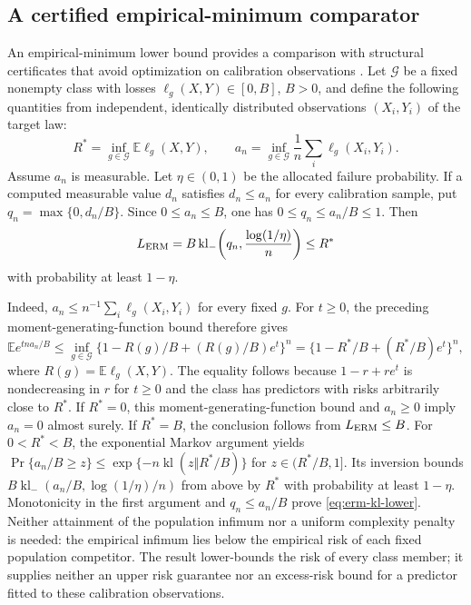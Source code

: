 \subsection{A certified empirical-minimum comparator}
\label{app:erm-comparator}

An empirical-minimum lower bound provides a comparison with structural
certificates that avoid optimization on calibration observations
\citep[Section~2.5]{kumar2026limits}. Let $\mathcal G$ be a fixed nonempty
class with losses $\ell_g(X,Y)\in[0,B]$, $B>0$, and define
the following quantities from independent, identically distributed
observations $(X_i,Y_i)$ of the target law:
\[
 R^*=\inf_{g\in\mathcal G}\mathbb E\ell_g(X,Y),\qquad
 a_n=\inf_{g\in\mathcal G}\frac1n\sum_i\ell_g(X_i,Y_i).
\]
Assume $a_n$ is measurable. Let $\eta\in(0,1)$ be the allocated failure
probability. If a computed measurable value $d_n$ satisfies $d_n\leq a_n$
for every calibration sample, put $q_n=\max\{0,d_n/B\}$.
Since $0\leq a_n\leq B$, one has $0\leq q_n\leq a_n/B\leq1$. Then
\begin{equation}
 L_{\rm ERM}
 =B\operatorname{kl}_-\!\left(q_n,\frac{\log(1/\eta)}{n}\right)
 \leq R^*
 \label{eq:erm-kl-lower}
\end{equation}
with probability at least $1-\eta$.

Indeed, $a_n\leq n^{-1}\sum_i\ell_g(X_i,Y_i)$ for every fixed $g$.
For $t\geq0$, the preceding moment-generating-function bound therefore gives
\[
 \mathbb E e^{tn a_n/B}
 \leq\inf_{g\in\mathcal G}
       \{1-R(g)/B+(R(g)/B)e^t\}^{n}
 =\{1-R^*/B+(R^*/B)e^t\}^{n},
\]
where $R(g)=\mathbb E\ell_g(X,Y)$.
The equality follows because $1-r+re^t$ is nondecreasing in $r$ for
$t\geq0$ and the class has predictors with risks arbitrarily close to $R^*$.
If $R^*=0$, this moment-generating-function bound and $a_n\geq0$ imply
$a_n=0$ almost surely. If $R^*=B$, the conclusion follows from
$L_{\rm ERM}\leq B$. For $0<R^*<B$, the exponential Markov argument yields
$\Pr\{a_n/B\geq z\}\leq
\exp\{-n\operatorname{kl}(z\Vert R^*/B)\}$ for $z\in(R^*/B,1]$.
Its inversion bounds $B\operatorname{kl}_-(a_n/B,\log(1/\eta)/n)$
from above by $R^*$ with probability at least $1-\eta$.
Monotonicity in the first argument and $q_n\leq a_n/B$ prove
\eqref{eq:erm-kl-lower}. Neither attainment of the population infimum nor
a uniform complexity penalty is needed: the empirical infimum lies below
the empirical risk of each fixed population competitor. The result
lower-bounds the risk of
every class member; it supplies neither an upper risk guarantee nor an
excess-risk bound for a predictor fitted to these calibration observations.

